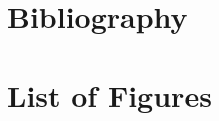 \section{Bibliography}
\begingroup
  \renewcommand{\chapter}[2]{} %
  
  
\endgroup
\newpage
\section{List of Figures}
\begingroup
  \renewcommand{\chapter}[2]{} %
  \listoffigures
\endgroup
%
% 
%
